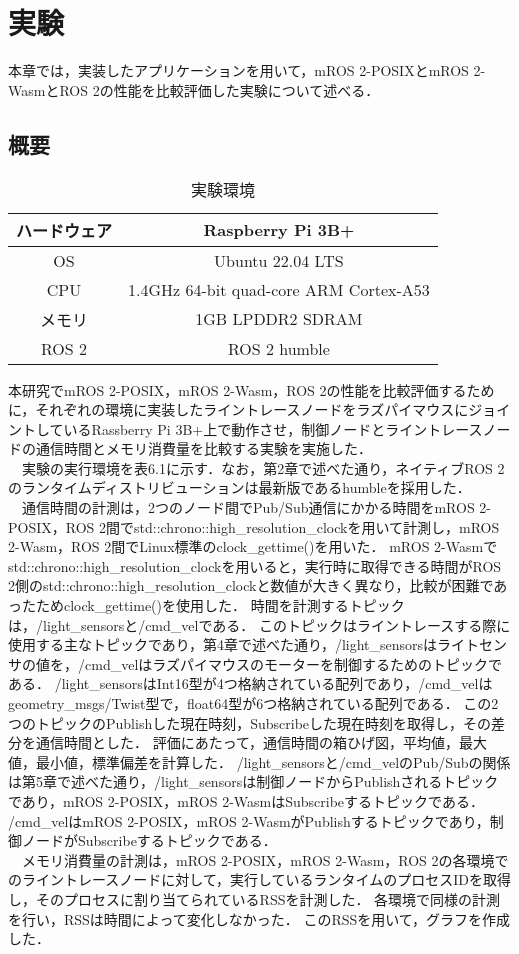 \chapter{実験}
\label{chap:evaluation}
本章では，実装したアプリケーションを用いて，mROS 2-POSIXとmROS 2-WasmとROS 2の性能を比較評価した実験について述べる．
\section{概要}
\begin{table}[HT]
    \caption{実験環境}
    \label{tab:experiment}
    \centering
    \begin{tabular}{|c|c|} \hline
      ハードウェア & Raspberry Pi 3B+ \\ \hline
      OS & Ubuntu 22.04 LTS \\ \hline
      CPU & 1.4GHz 64-bit quad-core ARM Cortex-A53 \\ \hline
      メモリ & 1GB LPDDR2 SDRAM \\ \hline
      ROS 2 & ROS 2 humble \\ \hline
    \end{tabular}
  \end{table}
本研究でmROS 2-POSIX，mROS 2-Wasm，ROS 2の性能を比較評価するために，それぞれの環境に実装したライントレースノードをラズパイマウスにジョイントしているRassberry Pi 3B+上で動作させ，制御ノードとライントレースノードの通信時間とメモリ消費量を比較する実験を実施した．
\\　実験の実行環境を表6.1に示す．なお，第2章で述べた通り，ネイティブROS 2のランタイムディストリビューションは最新版であるhumbleを採用した．
\\　通信時間の計測は，2つのノード間でPub/Sub通信にかかる時間をmROS 2-POSIX，ROS 2間でstd::chrono::high\_resolution\_clockを用いて計測し，mROS 2-Wasm，ROS 2間でLinux標準のclock_gettime()を用いた．
mROS 2-Wasmでstd::chrono::high\_resolution\_clockを用いると，実行時に取得できる時間がROS 2側のstd::chrono::high\_resolution\_clockと数値が大きく異なり，比較が困難であったためclock_gettime()を使用した．
時間を計測するトピックは，/light\_sensorsと/cmd\_velである．
このトピックはライントレースする際に使用する主なトピックであり，第4章で述べた通り，/light\_sensorsはライトセンサの値を，/cmd\_velはラズパイマウスのモーターを制御するためのトピックである．
/light\_sensorsはInt16型が4つ格納されている配列であり，/cmd\_velはgeometry\_msgs/Twist型で，float64型が6つ格納されている配列である．
この2つのトピックのPublishした現在時刻，Subscribeした現在時刻を取得し，その差分を通信時間とした．
評価にあたって，通信時間の箱ひげ図，平均値，最大値，最小値，標準偏差を計算した．
/light\_sensorsと/cmd\_velのPub/Subの関係は第5章で述べた通り，/light\_sensorsは制御ノードからPublishされるトピックであり，mROS 2-POSIX，mROS 2-WasmはSubscribeするトピックである．
/cmd\_velはmROS 2-POSIX，mROS 2-WasmがPublishするトピックであり，制御ノードがSubscribeするトピックである．
\\　メモリ消費量の計測は，mROS 2-POSIX，mROS 2-Wasm，ROS 2の各環境でのライントレースノードに対して，実行しているランタイムのプロセスIDを取得し，そのプロセスに割り当てられているRSSを計測した．
各環境で同様の計測を行い，RSSは時間によって変化しなかった．
このRSSを用いて，グラフを作成した．
